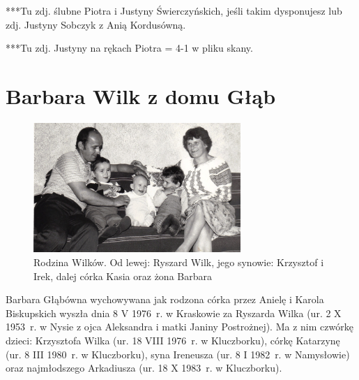 ***Tu zdj. ślubne Piotra i Justyny Świerczyńskich, jeśli takim dysponujesz lub zdj. Justyny Sobczyk z Anią Kordusówną.


***Tu zdj. Justyny na rękach Piotra = 4-1 w pliku skany.





\section{Barbara Wilk z domu Głąb}

\begin{figure}[!h]
\begin{center}
\includegraphics[width=0.7\textwidth]{zdjecia/barbara_i_ryszard_wilk_z_dziecmi.jpg}
\caption[Barbara i Ryszard Wilkowie z dziećmi]{Rodzina Wilków. Od lewej: Ryszard Wilk, jego synowie: Krzysztof i Irek, dalej córka Kasia oraz żona Barbara}
\label{rys:barbara_i_ryszard_wilk_z_dziecmi}
\end{center}
\end{figure}

Barbara Głąbówna wychowywana jak rodzona córka przez Anielę i Karola Biskupskich wyszła dnia 8 V 1976~r. w Kraskowie za Ryszarda Wilka (ur. 2 X 1953~r. w Nysie z ojca Aleksandra i matki Janiny Postrożnej). Ma z nim czwórkę dzieci: Krzysztofa Wilka (ur. 18 VIII 1976~r. w Kluczborku), córkę Katarzynę (ur. 8 III 1980~r. w Kluczborku), syna Ireneusza (ur. 8 I 1982~r. w Namysłowie) oraz najmłodszego Arkadiusza (ur. 18 X 1983~r. w Kluczborku).

